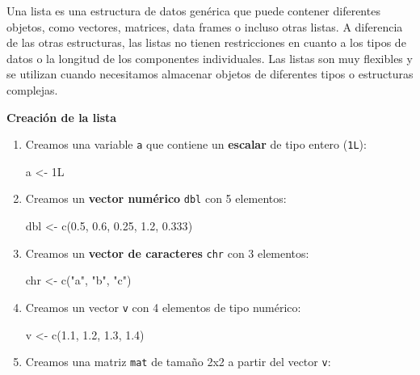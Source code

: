 \documentclass[
  a4paper,
]{article}
\newenvironment{Shaded}{}{}
\newcommand{\FloatTok}[1]{\textcolor[rgb]{0.00,0.36,0.77}{#1}}
\newcommand{\FunctionTok}[1]{\textcolor[rgb]{0.44,0.26,0.76}{#1}}
\newcommand{\NormalTok}[1]{\textcolor[rgb]{0.14,0.16,0.18}{#1}}
\newcommand{\OtherTok}[1]{\textcolor[rgb]{0.44,0.26,0.76}{#1}}
\newcommand{\StringTok}[1]{\textcolor[rgb]{0.01,0.18,0.38}{#1}}
\begin{document}
Una lista es una estructura de datos genérica que puede contener
diferentes objetos, como vectores, matrices, data frames o incluso otras
listas. A diferencia de las otras estructuras, las listas no tienen
restricciones en cuanto a los tipos de datos o la longitud de los
componentes individuales. Las listas son muy flexibles y se utilizan
cuando necesitamos almacenar objetos de diferentes tipos o estructuras
complejas.

\textbf{Creación de la lista}

\begin{enumerate}
\def\labelenumi{\arabic{enumi}.}
\item
  Creamos una variable \texttt{a} que contiene un \textbf{escalar} de
  tipo entero (\texttt{1L}):

\begin{Shaded}
\begin{Highlighting}[]
\NormalTok{a }\OtherTok{\textless{}{-}}\NormalTok{ 1L}
\end{Highlighting}
\end{Shaded}
\item
  Creamos un \textbf{vector numérico} \texttt{dbl} con 5 elementos:

\begin{Shaded}
\begin{Highlighting}[]
\NormalTok{dbl }\OtherTok{\textless{}{-}} \FunctionTok{c}\NormalTok{(}\FloatTok{0.5}\NormalTok{, }\FloatTok{0.6}\NormalTok{, }\FloatTok{0.25}\NormalTok{, }\FloatTok{1.2}\NormalTok{, }\FloatTok{0.333}\NormalTok{)}
\end{Highlighting}
\end{Shaded}
\item
  Creamos un \textbf{vector de caracteres} \texttt{chr} con 3 elementos:

\begin{Shaded}
\begin{Highlighting}[]
\NormalTok{chr }\OtherTok{\textless{}{-}} \FunctionTok{c}\NormalTok{(}\StringTok{"a"}\NormalTok{, }\StringTok{"b"}\NormalTok{, }\StringTok{"c"}\NormalTok{)}
\end{Highlighting}
\end{Shaded}
\item
  Creamos un vector \texttt{v} con 4 elementos de tipo numérico:

\begin{Shaded}
\begin{Highlighting}[]
\NormalTok{v }\OtherTok{\textless{}{-}} \FunctionTok{c}\NormalTok{(}\FloatTok{1.1}\NormalTok{, }\FloatTok{1.2}\NormalTok{, }\FloatTok{1.3}\NormalTok{, }\FloatTok{1.4}\NormalTok{)}
\end{Highlighting}
\end{Shaded}
\item
  Creamos una matriz \texttt{mat} de tamaño 2x2 a partir del vector
  \texttt{v}:


\end{enumerate}
\end{document}
